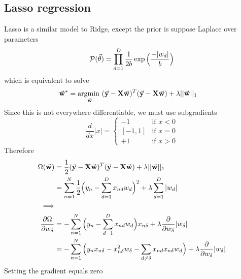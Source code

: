 \documentclass[../../main.tex]{subfiles}
\begin{document}
\subsection{Lasso regression}
Lasso is a similar model to Ridge, except the prior is suppose Laplace over parameters
\begin{equation*}
    \p(\vec{\theta}) = \prod_{d=1}^D \frac{1}{2b}\exp\Big(\dfrac{-|w_d|}{b}\Big)
\end{equation*}
which is equivalent to solve
\begin{align*}
    \vec{w}^*
    &= \argmin_{\vec{w}} (\vec{y}-\mat{X}\vec{w})^T(\vec{y}-\mat{X}\vec{w}) + \lambda||\vec{w}||_1
\end{align*}
Since this is not everywhere differentiable, we must use subgradients
\begin{equation*}
    \frac{d}{dx}|x|=
\begin{cases}
        { -1 } & \text{if } x<0 \\
        [-1, 1] & \text{if } x=0 \\
        { +1 } & \text{if } x>0
    \end{cases}
\end{equation*}
Therefore
\begin{align*}
    \Omega(\vec{w})
    &= \frac{1}{2}(\vec{y}-\mat{X}\vec{w})^T(\vec{y}-\mat{X}\vec{w}) + \lambda||\vec{w}||_1\\
    &= \sum_{n=1}^N \frac{1}{2}\Big(y_n - \sum_{d=1}^D x_{nd}w_d\Big)^2 + \lambda \sum_{d=1}^D|w_d|\\
    \Longrightarrow&\\
    \dfrac{\partial\Omega}{\partial w_\delta}
    &= -\sum_{n=1}^N \Big(y_n - \sum_{d=1}^D x_{nd}w_d\Big)x_{n\delta} + \lambda \frac{\partial}{\partial w_\delta}|w_\delta|\\
    &= -\sum_{n=1}^N \Big(y_n x_{n\delta} - x_{n\delta}^2 w_\delta - \sum_{d\neq\delta} x_{nd}x_{n\delta}w_d\Big)+ \lambda \frac{\partial}{\partial w_\delta}|w_\delta|\\
\end{align*}
Setting the gradient equals zero
\end{document}
